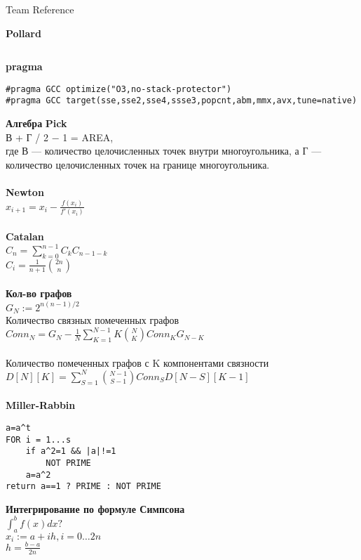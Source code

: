\documentclass[a4paper,12pt]{article}
\begin{document}
\vspace*{\fill}
\begin{center}{ \Large Team Reference} 
\end{center}
\vspace*{\fill}
\pagebreak

\textbf{Pollard} 
\inputminted[linenos, breaklines]{c++}{code/pollard.cpp}
\pagebreak
\textbf{pragma}
\begin{verbatim}
#pragma GCC optimize("O3,no-stack-protector")
#pragma GCC target(sse,sse2,sse4,ssse3,popcnt,abm,mmx,avx,tune=native)
\end{verbatim}

\textbf{Алгебра} 
{\bf Pick}\\
В + Г / 2 − 1 = AREA,\\
где В — количество целочисленных точек внутри многоугольника, а Г — количество целочисленных точек на границе многоугольника.\\\\

{\bf Newton}\\
$x_{i+1}=x_i-\frac {f(x_i)} {f'(x_i)}$\\\\

{\bf Catalan}\\
$C_n=\sum\limits_{k=0}^{n-1} C_{k} C_{n-1-k}$\\
$C_i=\frac 1 {n + 1} \binom {2n} {n}$\\\\

{\bf Кол-во графов}\\
$G_N:=2^{n(n-1)/2}$\\
Количество связных помеченных графов\\
$Conn_N = G_N - \frac 1 N \sum\limits_{K=1}^{N-1} K \binom N K Conn_K G_{N-K}$\\\\
Количество помеченных графов с K компонентами связности\\
$D[N][K]=\sum\limits_{S=1}^N \binom {N-1} {S-1} Conn_S D[N-S][K-1]$\\\\

{\bf Miller-Rabbin}
\begin{verbatim}
a=a^t
FOR i = 1...s
    if a^2=1 && |a|!=1
        NOT PRIME
    a=a^2
return a==1 ? PRIME : NOT PRIME
\end{verbatim}


{\bf Интегрирование по формуле Симпсона}\\
$\int_a^b f(x)dx ?$\\
$x_i := a+ih, i=0\ldots 2n$\\
$h = \frac {b-a} {2n}$\\
\end{document}
